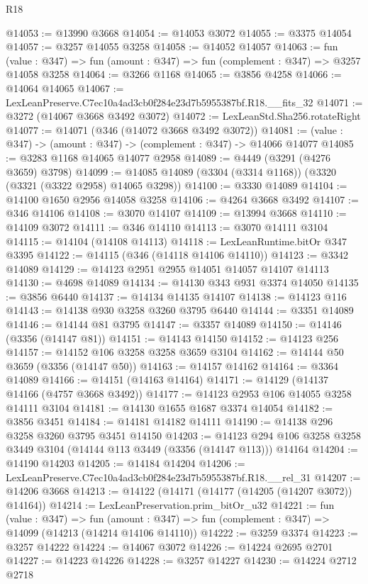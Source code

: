 \begin{lexlean}{R18}
\begin{coremodule}
@14053 := @13990 @3668
@14054 := @14053 @3072
@14055 := @3375 @14054
@14057 := @3257 @14055 @3258
@14058 := @14052 @14057
@14063 := fun (value : @347) => fun (amount : @347) => fun (complement : @347) => @3257 @14058 @3258
@14064 := @3266 @1168
@14065 := @3856 @4258
@14066 := @14064 @14065
@14067 := LexLeanPreserve.C7ec10a4ad3cb0f284e23d7b5955387bf.R18.__fits_32
@14071 := @3272 (@14067 @3668 @3492 @3072)
@14072 := LexLeanStd.Sha256.rotateRight
@14077 := @14071 (@346 (@14072 @3668 @3492 @3072))
@14081 := (value : @347) -> (amount : @347) -> (complement : @347) -> @14066 @14077
@14085 := @3283 @1168 @14065 @14077 @2958
@14089 := @4449 (@3291 (@4276 @3659) @3798)
@14099 := @14085 @14089 (@3304 (@3314 @1168)) (@3320 (@3321 (@3322 @2958) @14065 @3298))
@14100 := @3330 @14089
@14104 := @14100 @1650 @2956 @14058 @3258
@14106 := @4264 @3668 @3492
@14107 := @346 @14106
@14108 := @3070 @14107
@14109 := @13994 @3668
@14110 := @14109 @3072
@14111 := @346 @14110
@14113 := @3070 @14111 @3104
@14115 := @14104 (@14108 @14113)
@14118 := LexLeanRuntime.bitOr @347 @3395
@14122 := @14115 (@346 (@14118 @14106 @14110))
@14123 := @3342 @14089
@14129 := @14123 @2951 @2955 @14051 @14057 @14107 @14113
@14130 := @4698 @14089
@14134 := @14130 @343 @931 @3374 @14050
@14135 := @3856 @6440
@14137 := @14134 @14135 @14107
@14138 := @14123 @116
@14143 := @14138 @930 @3258 @3260 @3795 @6440
@14144 := @3351 @14089
@14146 := @14144 @81 @3795
@14147 := @3357 @14089
@14150 := @14146 (@3356 (@14147 @81))
@14151 := @14143 @14150
@14152 := @14123 @256
@14157 := @14152 @106 @3258 @3258 @3659 @3104
@14162 := @14144 @50 @3659 (@3356 (@14147 @50))
@14163 := @14157 @14162
@14164 := @3364 @14089
@14166 := @14151 (@14163 @14164)
@14171 := @14129 (@14137 @14166 (@4757 @3668 @3492))
@14177 := @14123 @2953 @106 @14055 @3258 @14111 @3104
@14181 := @14130 @1655 @1687 @3374 @14054
@14182 := @3856 @3451
@14184 := @14181 @14182 @14111
@14190 := @14138 @296 @3258 @3260 @3795 @3451 @14150
@14203 := @14123 @294 @106 @3258 @3258 @3449 @3104 (@14144 @113 @3449 (@3356 (@14147 @113))) @14164
@14204 := @14190 @14203
@14205 := @14184 @14204
@14206 := LexLeanPreserve.C7ec10a4ad3cb0f284e23d7b5955387bf.R18.__rel_31
@14207 := @14206 @3668
@14213 := @14122 (@14171 (@14177 (@14205 (@14207 @3072)) @14164))
@14214 := LexLeanPreservation.prim_bitOr_u32
@14221 := fun (value : @347) =>
  fun (amount : @347) => fun (complement : @347) => @14099 (@14213 (@14214 @14106 @14110))
@14222 := @3259 @3374
@14223 := @3257 @14222
@14224 := @14067 @3072
@14226 := @14224 @2695 @2701
@14227 := @14223 @14226
@14228 := @3257 @14227
@14230 := @14224 @2712 @2718

\end{coremodule}
\end{lexlean}
